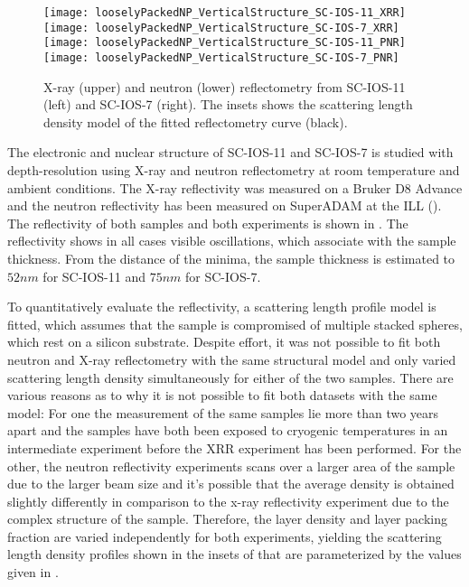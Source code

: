 \documentclass[\main/dresen_thesis.tex]{subfiles}
\begin{document}
  \label{sec:looselyPackedNS:layers:xrr}
  \begin{figure}[tb]
    \centering
    \texttt{[image: looselyPackedNP\_VerticalStructure\_SC-IOS-11\_XRR]}
    \texttt{[image: looselyPackedNP\_VerticalStructure\_SC-IOS-7\_XRR]}
    \texttt{[image: looselyPackedNP\_VerticalStructure\_SC-IOS-11\_PNR]}
    \texttt{[image: looselyPackedNP\_VerticalStructure\_SC-IOS-7\_PNR]}
    \caption{\label{fig:looselyPackedNP:layer:reflectivity}X-ray (upper) and neutron (lower) reflectometry from SC-IOS-11 (left) and SC-IOS-7 (right). The insets shows the scattering length density model of the fitted reflectometry curve (black).}
  \end{figure}

  The electronic and nuclear structure of SC-IOS-11 and SC-IOS-7 is studied with depth-resolution using X-ray and neutron reflectometry at room temperature and ambient conditions.
  The X-ray reflectivity was measured on a Bruker D8 Advance and the neutron reflectivity has been measured on SuperADAM at the ILL ().
  The reflectivity of both samples and both experiments is shown in .
  The reflectivity shows in all cases visible oscillations, which associate with the sample thickness.
  From the distance of the minima, the sample thickness is estimated to $52 \unit{nm}$ for SC-IOS-11 and $75 \unit{nm}$ for SC-IOS-7.

  To quantitatively evaluate the reflectivity, a scattering length profile model is fitted, which assumes that the sample is compromised of multiple stacked spheres, which rest on a silicon substrate.
  Despite effort, it was not possible to fit both neutron and X-ray reflectometry with the same structural model and only varied scattering length density simultaneously for either of the two samples.
  There are various reasons as to why it is not possible to fit both datasets with the same model:
  For one the measurement of the same samples lie more than two years apart and the samples have both been exposed to cryogenic temperatures in an intermediate experiment before the XRR experiment has been performed.
  For the other, the neutron reflectivity experiments scans over a larger area of the sample due to the larger beam size and it's possible that the average density is obtained slightly differently in comparison to the x-ray reflectivity experiment due to the complex structure of the sample.
  Therefore, the layer density and layer packing fraction are varied independently for both experiments, yielding the scattering length density profiles shown in the insets of  that are parameterized by the values given in .
\end{document}

